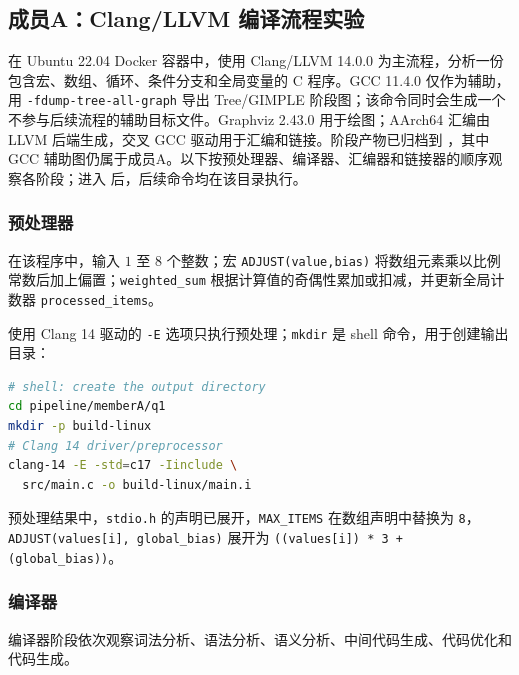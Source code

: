 \subsection{成员A：Clang/LLVM 编译流程实验}
在 Ubuntu 22.04 Docker 容器中，使用 Clang/LLVM 14.0.0 为主流程，分析一份包含宏、数组、循环、条件分支和全局变量的 C 程序。GCC 11.4.0 仅作为辅助，用 \texttt{-fdump-tree-all-graph} 导出 Tree/GIMPLE 阶段图；该命令同时会生成一个不参与后续流程的辅助目标文件。Graphviz 2.43.0 用于绘图；AArch64 汇编由 LLVM 后端生成，交叉 GCC 驱动用于汇编和链接。阶段产物已归档到 ，其中 GCC 辅助图仍属于成员A。以下按预处理器、编译器、汇编器和链接器的顺序观察各阶段；进入  后，后续命令均在该目录执行。

\subsubsection{预处理器}
在该程序中，输入 $1$ 至 $8$ 个整数；宏 \texttt{ADJUST(value,bias)} 将数组元素乘以比例常数后加上偏置；\texttt{weighted\_sum} 根据计算值的奇偶性累加或扣减，并更新全局计数器 \texttt{processed\_items}。




使用 Clang 14 驱动的 \texttt{-E} 选项只执行预处理；\texttt{mkdir} 是 shell 命令，用于创建输出目录：
\begin{lstlisting}[language=bash]
# shell: create the output directory
cd pipeline/memberA/q1
mkdir -p build-linux
# Clang 14 driver/preprocessor
clang-14 -E -std=c17 -Iinclude \
  src/main.c -o build-linux/main.i
\end{lstlisting}
预处理结果中，\texttt{stdio.h} 的声明已展开，\texttt{MAX\_ITEMS} 在数组声明中替换为 \texttt{8}，\texttt{ADJUST(values[i], global\_bias)} 展开为 \texttt{((values[i]) * 3 + (global\_bias))}。

\subsubsection{编译器}
编译器阶段依次观察词法分析、语法分析、语义分析、中间代码生成、代码优化和代码生成。

